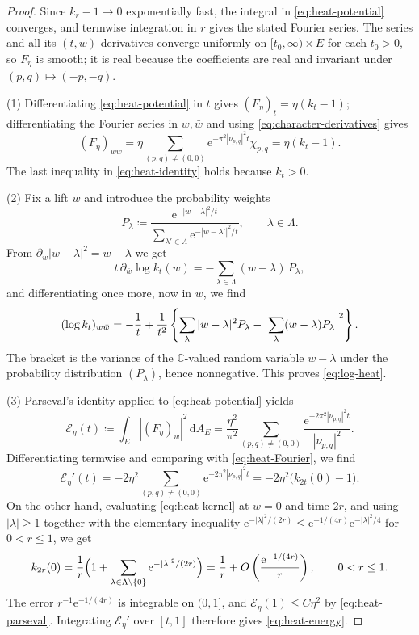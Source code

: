 \documentclass[10pt,a4paper]{amsart}
\begin{document}
	\begin{proof}
		Since
		$k_r-1\to0$ exponentially fast, the integral in
		\eqref{eq:heat-potential} converges, and termwise integration in $r$
		gives the stated Fourier series.  The series and all its
		$(t,w)$-derivatives converge uniformly on $[t_0,\infty)\times E$ for
		each $t_0>0$, so $F_\eta$ is smooth; it is real because the
		coefficients are real and invariant under
		$(p,q)\mapsto(-p,-q)$.
		
		(1)  Differentiating \eqref{eq:heat-potential} in $t$ gives
		$(F_\eta)_t=\eta(k_t-1)$; differentiating the Fourier series in
		$w,\bar w$ and using \eqref{eq:character-derivatives} gives
		\[
		(F_\eta)_{w\bar w}
		=\eta\sum_{(p,q)\ne(0,0)}\mathrm{e}^{-\pi^2|\nu_{p,q}|^2t}\chi_{p,q}
		=\eta(k_t-1). 
		\]
		The last inequality in \eqref{eq:heat-identity} holds
		because $k_t>0$.
		
		(2)  Fix a lift $w$ and introduce the probability weights
		\[
		P_{\lambda}\coloneqq \frac{\mathrm{e}^{-|w-\lambda|^2/t}}
		{\sum_{\lambda'\in\Lambda}\mathrm{e}^{-|w-\lambda'|^2/t}},
		\qquad\lambda\in\Lambda .
		\]
		From $\partial_{\bar w}|w-\lambda|^2=w-\lambda$ we get
		\begin{equation}
			t\,\partial_{\bar w}\log k_t(w)
			=-\sum_{\lambda\in\Lambda}(w-\lambda)\,P_\lambda ,
			\label{eq:heat-log-gradient-exact}
		\end{equation}
		and differentiating once more, now in $w$, we find
		\[
		(\log k_t)_{w\bar w}
		=-\frac1t+\frac1{t^2}
		\left\{
		\sum_{\lambda}|w-\lambda|^2P_{\lambda}
		-\Bigl|\sum_{\lambda}(w-\lambda)P_{\lambda}\Bigr|^2
		\right\}.
		\]
		The bracket is the variance of the $\mathbb C$-valued random variable
		$w-\lambda$ under the probability distribution $(P_\lambda)$, hence
		nonnegative.  This proves \eqref{eq:log-heat}.
		
		(3) Parseval's identity applied to \eqref{eq:heat-potential} yields
		\begin{equation}
			\mathcal E_\eta(t)\coloneqq \int_E|(F_\eta)_w|^2\,\mathrm{d}A_E
			=\frac{\eta^2}{\pi^2}
			\sum_{(p,q)\ne(0,0)}
			\frac{\mathrm{e}^{-2\pi^2|\nu_{p,q}|^2t}}
			{|\nu_{p,q}|^2}.
			\label{eq:heat-parseval}
		\end{equation}
		Differentiating termwise and comparing with \eqref{eq:heat-Fourier}, we find
		\[
		\mathcal E_\eta'(t)
		=-2\eta^2\sum_{(p,q)\ne(0,0)}\mathrm{e}^{-2\pi^2|\nu_{p,q}|^2t}
		=-2\eta^2\bigl(k_{2t}(0)-1\bigr).
		\]
		On the other hand, evaluating \eqref{eq:heat-kernel} at $w=0$ and time $2r$, and using $|\lambda|\ge1$ together with the elementary inequality 
		\(
		\mathrm{e}^{-|\lambda|^2/(2r)}\le
		\mathrm{e}^{-1/(4r)}\mathrm{e}^{-|\lambda|^2/4}
		\)
		for $0<r\le1$, we get
		\[
		k_{2r}(0)
		=\frac1r\Bigl(1+
		\sum_{\lambda\in\Lambda\setminus\{0\}}
		\mathrm{e}^{-|\lambda|^2/(2r)}\Bigr)
		=\frac1r+O\left(\frac{\mathrm{e}^{-1/(4r)}}{r}\right),
		\qquad 0<r\le1 .
		\]
		The error $r^{-1}\mathrm{e}^{-1/(4r)}$ is integrable on $(0,1]$, and
		$\mathcal E_\eta(1)\le C\eta^2$ by \eqref{eq:heat-parseval}.
		Integrating $\mathcal E_\eta'$ over $[t,1]$ therefore gives
		\eqref{eq:heat-energy}.
		

\end{proof}
\end{document}
